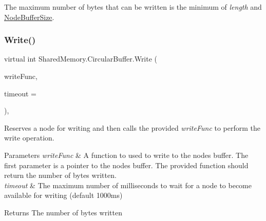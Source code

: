 The maximum number of bytes that can be written is the minimum of {\itshape length}  and \hyperlink{class_shared_memory_1_1_circular_buffer_a25a6c6b560e818ef1ba6d645e0e14018}{Node\+Buffer\+Size}.\mbox{\label{class_shared_memory_1_1_circular_buffer_aea9b35786dbdb15df6bb21e2e85fdb29}} 
\subsubsection{\texorpdfstring{Write()}{Write()}\hspace{0.1cm}{\footnotesize\ttfamily [3/3]}}
{\footnotesize\ttfamily virtual int Shared\+Memory.\+Circular\+Buffer.\+Write (\begin{DoxyParamCaption}\item[{Func$<$ Int\+Ptr, int $>$}]{write\+Func,  }\item[{int}]{timeout = {} }\end{DoxyParamCaption})\hspace{0.3cm}{\ttfamily [inline]}, {\ttfamily [virtual]}}



Reserves a node for writing and then calls the provided {\itshape write\+Func}  to perform the write operation. 


\begin{DoxyParams}{Parameters}
{\em write\+Func} & A function to used to write to the node\textquotesingle{}s buffer. The first parameter is a pointer to the node\textquotesingle{}s buffer. The provided function should return the number of bytes written.\\
\hline
{\em timeout} & The maximum number of milliseconds to wait for a node to become available for writing (default 1000ms)\\
\hline
\end{DoxyParams}
\begin{DoxyReturn}{Returns}
The number of bytes written
\end{DoxyReturn}
\mbox{\label{class_shared_memory_1_1_circular_buffer_a588d16fbdffec14ee4d5e962ffae9bbf}} 
